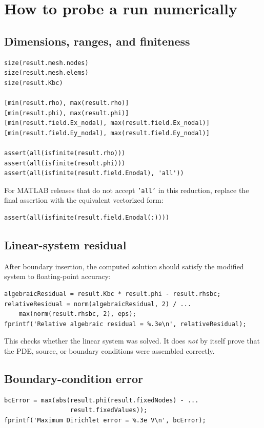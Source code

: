 \documentclass[11pt]{article}
\begin{document}
\section{How to probe a run numerically}

\subsection{Dimensions, ranges, and finiteness}

\begin{lstlisting}[style=projectmatlab]
size(result.mesh.nodes)
size(result.mesh.elems)
size(result.Kbc)

[min(result.rho), max(result.rho)]
[min(result.phi), max(result.phi)]
[min(result.field.Ex_nodal), max(result.field.Ex_nodal)]
[min(result.field.Ey_nodal), max(result.field.Ey_nodal)]

assert(all(isfinite(result.rho)))
assert(all(isfinite(result.phi)))
assert(all(isfinite(result.field.Enodal), 'all'))
\end{lstlisting}
For MATLAB releases that do not accept \texttt{'all'} in this reduction, replace the final assertion with the equivalent vectorized form:
\begin{lstlisting}[style=projectmatlab]
assert(all(isfinite(result.field.Enodal(:))))
\end{lstlisting}

\subsection{Linear-system residual}

After boundary insertion, the computed solution should satisfy the modified system to floating-point accuracy:
\begin{lstlisting}[style=projectmatlab]
algebraicResidual = result.Kbc * result.phi - result.rhsbc;
relativeResidual = norm(algebraicResidual, 2) / ...
    max(norm(result.rhsbc, 2), eps);
fprintf('Relative algebraic residual = %.3e\n', relativeResidual);
\end{lstlisting}
This checks whether the linear system was solved. It does \emph{not} by itself prove that the PDE, source, or boundary conditions were assembled correctly.

\subsection{Boundary-condition error}

\begin{lstlisting}[style=projectmatlab]
bcError = max(abs(result.phi(result.fixedNodes) - ...
                  result.fixedValues));
fprintf('Maximum Dirichlet error = %.3e V\n', bcError);
\end{lstlisting}
\end{document}
